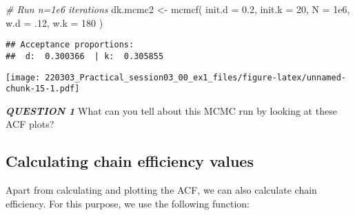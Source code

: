 \documentclass[
]{article}
\newenvironment{Shaded}{\begin{snugshade}}{\end{snugshade}}
\newcommand{\AttributeTok}[1]{\textcolor[rgb]{0.77,0.63,0.00}{#1}}
\newcommand{\CommentTok}[1]{\textcolor[rgb]{0.56,0.35,0.01}{\textit{#1}}}
\newcommand{\ControlFlowTok}[1]{\textcolor[rgb]{0.13,0.29,0.53}{\textbf{#1}}}
\newcommand{\DecValTok}[1]{\textcolor[rgb]{0.00,0.00,0.81}{#1}}
\newcommand{\FloatTok}[1]{\textcolor[rgb]{0.00,0.00,0.81}{#1}}
\newcommand{\FunctionTok}[1]{\textcolor[rgb]{0.00,0.00,0.00}{#1}}
\newcommand{\NormalTok}[1]{#1}
\newcommand{\OtherTok}[1]{\textcolor[rgb]{0.56,0.35,0.01}{#1}}
\newcommand{\SpecialCharTok}[1]{\textcolor[rgb]{0.00,0.00,0.00}{#1}}
\begin{document}
\begin{Shaded}
\begin{Highlighting}[]
\CommentTok{\# Run n=1e6 iterations}
\NormalTok{dk.mcmc2 }\OtherTok{\textless{}{-}} \FunctionTok{mcmcf}\NormalTok{( }\AttributeTok{init.d =} \FloatTok{0.2}\NormalTok{, }\AttributeTok{init.k =} \DecValTok{20}\NormalTok{, }\AttributeTok{N =} \FloatTok{1e6}\NormalTok{,}
                   \AttributeTok{w.d =}\NormalTok{ .}\DecValTok{12}\NormalTok{, }\AttributeTok{w.k =} \DecValTok{180}\NormalTok{ )}
\end{Highlighting}
\end{Shaded}

\begin{verbatim}
## Acceptance proportions:
##  d:  0.300366  | k:  0.305855
\end{verbatim}

\begin{Shaded}
\end{Shaded}

\texttt{[image: 220303\_Practical\_session03\_00\_ex1\_files/figure-latex/unnamed-chunk-15-1.pdf]}

\emph{\textbf{QUESTION 1}} What can you tell about this MCMC run by
looking at these ACF plots?

\hypertarget{calculating-chain-efficiency-values}{%
\subsection{Calculating chain efficiency
values}\label{calculating-chain-efficiency-values}}

Apart from calculating and plotting the ACF, we can also calculate chain
efficiency. For this purpose, we use the following function:

\begin{Shaded}
\end{Shaded}
\end{document}
